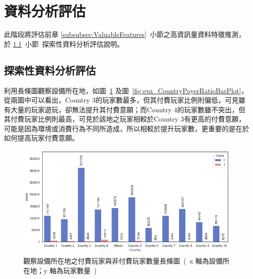 \section{資料分析評估}
\label{sec:DataAnalysisEvaluation}

此階段將評估前章 \ref{subsubsec:ValuableFeatures}~小節之高資訊量資料特徵推測，於 \ref{subsec:EDAEvaluation}~小節\ 探索性資料分析評估說明。

\subsection{探索性資料分析評估}
\label{subsec:EDAEvaluation}

利用長條圖觀察設備所在地，如圖~\ref{fig:eva_CountryBarPlot} 及圖~\ref{fig:eva_CountryPayerRatioBarPlot}，從兩圖中可以看出，Country 3的玩家數最多，但其付費玩家比例則偏低，可見雖有大量的玩家遊玩，卻無法提升其付費意願；而Country 4的玩家數雖不突出，但其付費玩家比例則最高，可見於該地之玩家相較於Country 3有更高的付費意願，可能是因為環境或消費行為不同所造成，所以相較於提升玩家數，更重要的是在於如何提高玩家付費意願。

\begin{figure}[!htb]
    \begin{center}
      \includegraphics[width=1\textwidth]{figures/evaluation/Image_CountryBarPlot.png}
      \caption[觀察設備所在地之付費玩家與非付費玩家數量長條圖]{觀察設備所在地之付費玩家與非付費玩家數量長條圖\ (\ x 軸為設備所在地；y 軸為玩家數量\ )\ }
      \label{fig:eva_CountryBarPlot}
    \end{center}
\end{figure}
\newpage

